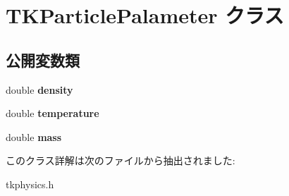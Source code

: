 \hypertarget{class_t_k_particle_palameter}{}\section{T\+K\+Particle\+Palameter クラス}
\label{class_t_k_particle_palameter}
\subsection*{公開変数類}
\begin{DoxyCompactItemize}
\item 
\mbox{\label{class_t_k_particle_palameter_a23ae16244a4143ee0642cf6620facf31}} 
double {\bfseries density}
\item 
\mbox{\label{class_t_k_particle_palameter_a65c396039f6aaf454837c2139af9da65}} 
double {\bfseries temperature}
\item 
\mbox{\label{class_t_k_particle_palameter_a9be89d1ba1cb6c97e6154bf9f91f2437}} 
double {\bfseries mass}
\end{DoxyCompactItemize}


このクラス詳解は次のファイルから抽出されました\+:\begin{DoxyCompactItemize}
\item 
tkphysics.\+h\end{DoxyCompactItemize}
